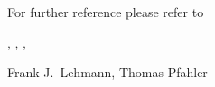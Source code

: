 For further reference please refer to 



\SEEALSO

, ,
, 



\AUTHOR

Frank J.~Lehmann, Thomas Pfahler
